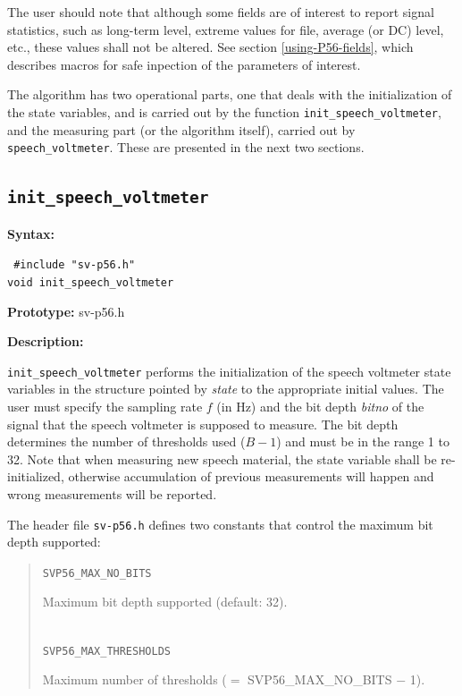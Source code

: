 The user should note that although some fields are of interest to report signal
statistics, such as long-term level, extreme values for file, average
(or DC) level, etc., these values shall not be altered. See section 
\ref{using-P56-fields}, which describes macros for safe inpection of 
the parameters of interest.

The algorithm has two operational parts, one that deals with the
initialization of the state variables, and is carried out by the
function {\tt init\_speech\_voltmeter}, and the measuring part (or the
algorithm itself), carried out by {\tt speech\_voltmeter}. These are
presented in the next two sections.


\subsection{{\tt init\_speech\_voltmeter}}

{\bf Syntax: } 

{\tt
\#include "sv-p56.h"\\
void init\_speech\_voltmeter
}

{\bf Prototype: }       sv-p56.h

{\bf Description: }

{\tt init\_speech\_voltmeter} performs the initialization of the
speech voltmeter state variables in the structure pointed by {\em
state} to the appropriate initial values. The user must specify the
sampling rate $f$ (in Hz) and the bit depth {\em bitno} of the signal
that the speech voltmeter is supposed to measure. The bit depth
determines the number of thresholds used ($B-1$) and must be in the
range 1 to 32. Note that when measuring new
speech material, the state variable shall be re-initialized, otherwise
accumulation of previous measurements will happen and wrong measurements 
will be reported.

The header file {\tt sv-p56.h} defines two constants that control the
maximum bit depth supported:
\begin{quote} \normalsize
 {\tt SVP56\_MAX\_NO\_BITS} \hfill \parbox{100mm}{\SF Maximum bit depth supported (default: 32). }\\
 {\tt SVP56\_MAX\_THRESHOLDS} \hfill \parbox{100mm}{\SF Maximum number of thresholds ($=$ SVP56\_MAX\_NO\_BITS $-$ 1). }
\end{quote}


